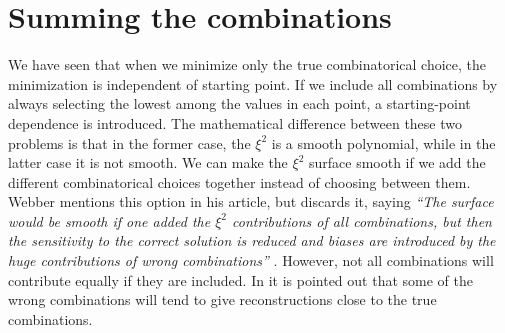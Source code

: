 \documentclass[twoside,english]{uiofysmaster}
\begin{document}
\section{Summing the combinations}
\label{sec:combinatorics-sum_all_contributions}
We have seen that when we minimize only the true combinatorical choice, the minimization is independent of starting point. If we include all combinations by always selecting the lowest among the values in each point, a starting-point dependence is introduced. The mathematical difference between these two problems is that in the former case, the $\xi^2$ is a smooth polynomial, while in the latter case it is not smooth. We can make the $\xi^2$ surface smooth if we add the different combinatorical choices together instead of choosing between them. Webber mentions this option in his article, but discards it, saying {\it ``The surface would be smooth if one added the $\xi^2$ contributions of all combinations,  but then the sensitivity to the correct solution is reduced and biases are introduced by the huge contributions of wrong combinations''} \cite{Webber:2009vm}. However, not all combinations will contribute equally if they are included. In \cite{Gripaios:2011jm} it is pointed out that some of the wrong combinations will tend to give reconstructions close to the true combinations. 
\end{document}
